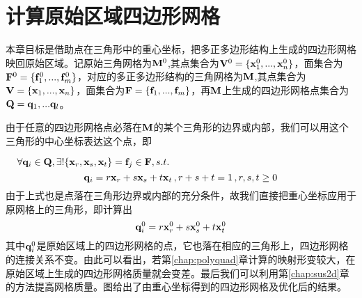 \chapter{计算原始区域四边形网格}

本章目标是借助点在三角形中的重心坐标，把多正多边形结构上生成的四边形网格映回原始区域。记原始三角网格为$\mathbf{M}^0$,其点集合为$\mathbf{V}^0=\{\mathbf{x}_1^0,...,\mathbf{x}_n^0\}$，面集合为$\mathbf{F}^0=\{\mathbf{f}_1^0,...,\mathbf{f}_m^0\}$，对应的多正多边形结构的三角网格为$\mathbf{M} $,其点集合为$\mathbf{V}=\{\mathbf{x}_1,...,\mathbf{x}_n\}$，面集合为$\mathbf{F}=\{\mathbf{f}_1,...,\mathbf{f}_m\}$，再$\mathbf{M}$上生成的四边形网格点集合为$\mathbf{Q}={\mathbf{q}_1,...\mathbf{q}_l}$。

由于任意的四边形网格点必落在$\mathbf{M}$的某个三角形的边界或内部，我们可以用这个三角形的中心坐标表达这个点，即

$\,\,\,\,\,\,\,\forall \mathbf{q}_i \in \mathbf{Q}, \exists ! \{\mathbf{x}_r,\mathbf{x}_s,\mathbf{x}_t\}=\mathbf{f}_j \in \mathbf{F}, s.t.$
\begin{equation}\label{equ:meancoor}
\mathbf{q}_i=r\mathbf{x}_r+s\mathbf{x}_s+t\mathbf{x}_t\,,r+s+t=1\,,r,s,t\geq 0
\end{equation}
由于上式也是点落在三角形边界或内部的充分条件，故我们直接把重心坐标应用于原网格上的三角形，即计算出
\begin{equation} \label{equ:quadvertex}
\mathbf{q}_i^0=r\mathbf{x}_r^0+s\mathbf{x}_s^0+t\mathbf{x}_t^0
\end{equation}
其中$\mathbf{q}_i^0$是原始区域上的四边形网格的点，它也落在相应的三角形上，四边形网格的连接关系不变。由此可以看出，若第\ref{chap:polyquad}章计算的映射形变较大，在原始区域上生成的四边形网格质量就会变差。最后我们可以利用第\ref{chap:sus2d}章的方法提高网格质量。图给出了由重心坐标得到的四边形网格及优化后的结果。

